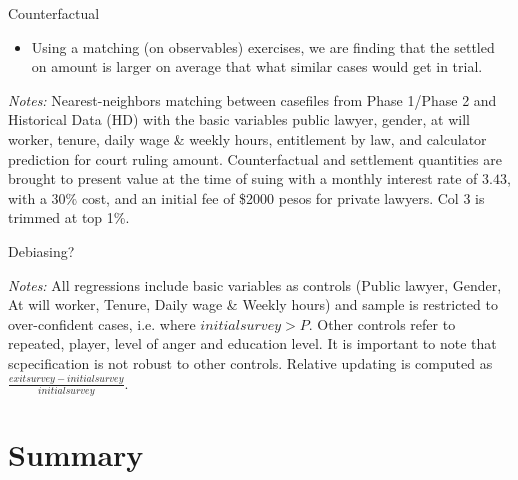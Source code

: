 \documentclass[9pt]{beamer}
\begin{document}
\begin{frame}{Counterfactual}

\begin{itemize}
    \item Using a matching (on observables) exercises, we are finding that the settled on amount is larger on average that what similar cases would get in trial. 
\end{itemize}

  \hskip-6.0cm\begin{table}
    \label{match_table}
    \tiny{}
\end{table}
    \footnotesize
    \tiny{\textit{Notes:} 
Nearest-neighbors matching between casefiles from Phase 1/Phase 2 and Historical Data (HD) with the basic variables public lawyer, gender, at will worker, tenure, daily wage \& weekly hours, entitlement by law, and calculator prediction for court ruling amount. Counterfactual and settlement quantities are brought to present value at the time of suing with a monthly interest rate of $3.43$, with a $30\%$ cost, and an initial fee of \$2000 pesos for private lawyers. Col 3 is trimmed at top 1\%.}
\end{frame}


\begin{frame}{Debiasing?}
 \begin{table}[H]
  \resizebox{0.9\textwidth}{!}{\begin{minipage}{\textwidth}
\label{update_rel_oc}
\begin{center}
\scriptsize{}
\end{center}
\end{minipage}}
\end{table}
 \footnotesize
\textit{Notes:} 
All regressions include basic variables as controls (Public lawyer, Gender, At will worker, Tenure, Daily wage \& Weekly hours) and sample is restricted to over-confident cases, i.e. where  $initialsurvey>P$. Other controls refer to repeated, player, level of anger and education level. It is important to note that scpecification is not robust to other controls.  Relative updating is computed as $\frac{exitsurvey-initialsurvey}{initialsurvey}$.
\end{frame}


\section*{Summary}
\end{document}
